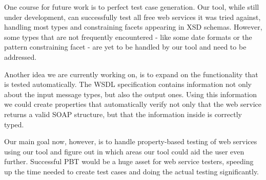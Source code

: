 \documentclass[submission,copyright]{eptcs}
\begin{document}
One course for future work is to perfect test case generation. Our tool, 
while still under development, can successfully test all free web
services it was tried against, handling most types and constraining
facets appearing in XSD schemas. However, some types that are not
frequently encountered - like some date formats or the pattern
constraining facet - are yet to be handled by our tool and need to be addressed.

Another idea we are currently working on, is to expand on the functionality 
that is tested automatically. The WSDL specification contains information not
only about the input message types, but also the output ones. Using this
information we could create properties that automatically verify not only that
the web service returns a valid SOAP structure, but that the information inside
is correctly typed.

Our main goal now, however, is to handle property-based testing of web services 
using our tool and figure out in which areas our tool could aid the user even 
further. Successful PBT would be a huge asset for web service testers, speeding 
up the time needed to create test cases and doing the actual testing 
significantly.



\end{document}
